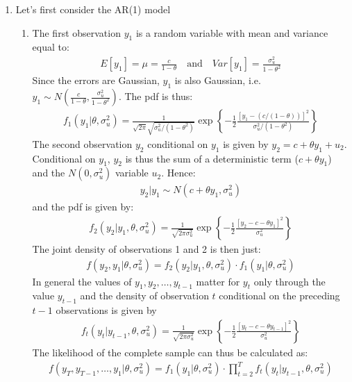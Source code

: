 \begin{enumerate}

\item
Let's first consider the AR{(1)} model
\begin{enumerate}
  \item
  The first observation \(y_1\) is a random variable with mean and variance equal to:
  \begin{align*}
  E[y_1] = \mu = \frac{c}{1-\theta} \quad\text{and}\quad Var[y_1] = \frac{\sigma_u^2}{1-\theta^2}
  \end{align*}
  Since the errors are Gaussian, \(y_1\) is also Gaussian, i.e.\
  \(y_1 \sim N\left(\frac{c}{1-\theta},\frac{\sigma_u^2}{1-\theta^2}\right)\).
  The pdf is thus:
  \begin{align*}
  f_1(y_1|\theta,\sigma_u^2) = \frac{1}{\sqrt{2\pi}\sqrt{\sigma_u^2/(1-\theta^2)}}\exp\left \{-\frac{1}{2}\frac{{[y_1-(c/(1-\theta))]}^2}{\sigma_u^2/(1-\theta^2)}\right \}
  \end{align*}
  The second observation \(y_2\) conditional on \(y_1\) is given by \(y_2 = c + \theta y_1 + u_2\).
  Conditional on \(y_1\), \(y_2\) is thus the sum of a deterministic term (\(c+\theta y_1\))
    and the \(N(0,\sigma_u^2)\) variable \(u_2\).
  Hence:
  \begin{align*}
  y_2|y_1 \sim N(c+\theta y_1,\sigma_u^2)
  \end{align*}
  and the pdf is given by:
  \begin{align*}
  f_2(y_2|y_1,\theta,\sigma_u^2) = \frac{1}{\sqrt{2\pi\sigma_u^2}}\exp\left \{-\frac{1}{2}\frac{[y_2-c-\theta y_1]^2}{\sigma_u^2}\right \}
  \end{align*}
  The joint density of observations 1 and 2 is then just:
  \begin{align*}
  f(y_2,y_1|\theta,\sigma_u^2) = f_2(y_2|y_1,\theta,\sigma_u^2) \cdot f_1(y_1|\theta,\sigma_u^2)
  \end{align*}
  In general the values of \(y_1,y_2,\ldots ,y_{t-1}\) matter for \(y_t\) only through the value \(y_{t-1}\)
    and the density of observation \(t\) conditional on the preceding \(t-1\) observations is given by
  \begin{align*}
  f_t(y_t|y_{t-1},\theta,\sigma_u^2) = \frac{1}{\sqrt{2\pi\sigma_u^2}}\exp\left \{-\frac{1}{2}\frac{[y_t-c-\theta y_{t-1}]^2}{\sigma_u^2}\right \}
  \end{align*}
  The likelihood of the complete sample can thus be calculated as:
  \begin{align*}
  f(y_T,y_{T-1},\ldots ,y_1|\theta,\sigma_u^2)=f_1(y_1|\theta,\sigma_u^2)\cdot \prod_{t=2}^{T}f_t(y_t|y_{t-1},\theta,\sigma_u^2)

\end{align*}
\end{enumerate}
\end{enumerate}
